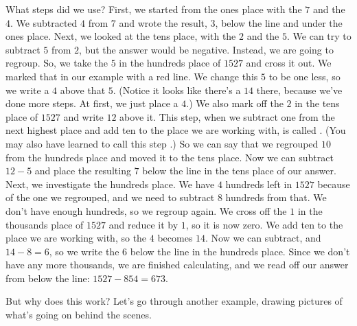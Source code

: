 \documentclass{ximera}
\begin{document}
What steps did we use? First, we started from the ones place with the $7$ and the $4$. We subtracted $4$ from $7$ and wrote the result, $3$, below the line and under the ones place. Next, we looked at the tens place, with the $2$ and the $5$. We can try to subtract $5$ from $2$, but the answer would be negative. Instead, we are going to regroup. So, we take the $5$ in the hundreds place of $1527$ and cross it out. We marked that in our example with a red line. We change this $5$ to be one less, so we write a $4$ above that $5$. (Notice it looks like there's a $14$ there, because we've done more steps. At first, we just place a $4$.) We also mark off the $2$ in the tens place of $1527$ and write $12$ above it. This step, when we subtract one from the next highest place and add ten to the place we are working with, is called . (You may also have learned to call this step .) So we can say that we regrouped $10$ from the hundreds place and moved it to the tens place. Now we can subtract $12-5$ and place the resulting $7$ below the line in the tens place of our answer. Next, we investigate the hundreds place. We have $4$ hundreds left in $1527$ because of the one we regrouped, and we need to subtract $8$ hundreds from that. We don't have enough hundreds, so we regroup again. We cross off the $1$ in the thousands place of $1527$ and reduce it by $1$, so it is now zero. We add ten to the place we are working with, so the $4$ becomes $14$. Now we can subtract, and $14-8 = 6$, so we write the $6$ below the line in the hundreds place. Since we don't have any more thousands, we are finished calculating, and we read off our answer from below the line: $1527 - 854 = 673$.

But why does this work? Let's go through another example, drawing pictures of what's going on behind the scenes.
\end{document}
